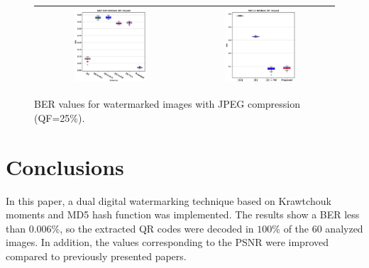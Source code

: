 \documentclass[runningheads]{llncs}
\begin{document}
\begin{figure}[H]
	\begin{center}
		\begin{tabular}{|c|c|}\hline
			\includegraphics[width=0.5\textwidth]{BER25SaintGall.eps}
			&\includegraphics[width=0.5\textwidth]{BER25Parzival.eps}\\\hline
		\end{tabular}
	\end{center}
	\caption{BER values for watermarked images with JPEG compression (QF=25\%).}
	\label{ber25}
\end{figure}

\section{Conclusions}
In this paper, a dual digital watermarking technique based on Krawtchouk moments and MD5 hash function was implemented. The results show a BER less than $0.006 \%$, so the extracted QR codes were decoded in $100\%$ of the $60$ analyzed images. In addition, the values corresponding to the PSNR were improved compared to previously presented papers.
%
%
%


%
\end{document}
